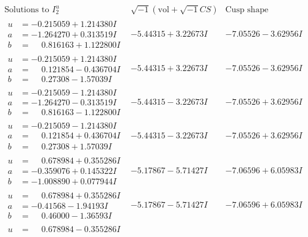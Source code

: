 \documentclass[1p]{elsarticle_modified}
\theoremstyle{definition}
\newcommand{\I}{\sqrt{-1}}
\begin{document}
$$\begin{array}{c|c|c}  
\text{Solutions to }I^u_{2}& \I (\text{vol} + \sqrt{-1}CS) & \text{Cusp shape}\\
 \hline 
\begin{aligned}
u &= -0.215059 + 1.214380 I \\
a &= -1.264270 + 0.313519 I \\
b &= \phantom{-}0.816163 + 1.122800 I\end{aligned}
 & -5.44315 + 3.22673 I & -7.05526 - 3.62956 I \\ \hline\begin{aligned}
u &= -0.215059 + 1.214380 I \\
a &= \phantom{-}0.121854 - 0.436704 I \\
b &= \phantom{-}0.27308 - 1.57039 I\end{aligned}
 & -5.44315 + 3.22673 I & -7.05526 - 3.62956 I \\ \hline\begin{aligned}
u &= -0.215059 - 1.214380 I \\
a &= -1.264270 - 0.313519 I \\
b &= \phantom{-}0.816163 - 1.122800 I\end{aligned}
 & -5.44315 - 3.22673 I & -7.05526 + 3.62956 I \\ \hline\begin{aligned}
u &= -0.215059 - 1.214380 I \\
a &= \phantom{-}0.121854 + 0.436704 I \\
b &= \phantom{-}0.27308 + 1.57039 I\end{aligned}
 & -5.44315 - 3.22673 I & -7.05526 + 3.62956 I \\ \hline\begin{aligned}
u &= \phantom{-}0.678984 + 0.355286 I \\
a &= -0.359076 + 0.145322 I \\
b &= -1.008890 + 0.077944 I\end{aligned}
 & -5.17867 - 5.71427 I & -7.06596 + 6.05983 I \\ \hline\begin{aligned}
u &= \phantom{-}0.678984 + 0.355286 I \\
a &= -0.41568 - 1.94193 I \\
b &= \phantom{-}0.46000 - 1.36593 I\end{aligned}
 & -5.17867 - 5.71427 I & -7.06596 + 6.05983 I \\ \hline\begin{aligned}
u &= \phantom{-}0.678984 - 0.355286 I \\

\end{aligned}
\end{array}$$
\end{document}
